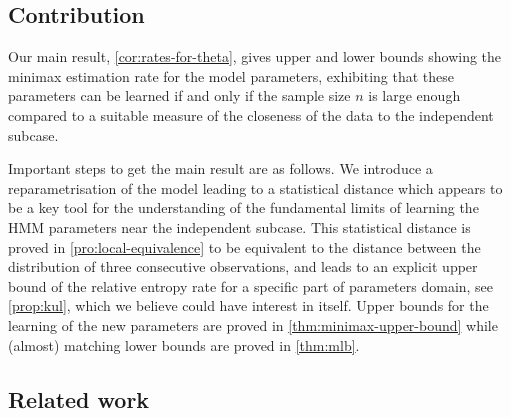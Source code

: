 \documentclass[journal]{IEEEtran}
\newcommand{\1}{\boldsymbol{1}}
\begin{document}



	\subsection{Contribution}

	Our main result, \cref{cor:rates-for-theta}, gives upper and lower bounds showing the minimax estimation rate for the model parameters, exhibiting that these parameters can be learned if and only if the sample size $n$ is large enough compared to a suitable measure of the closeness of the data to the independent subcase.


	Important steps to get the main result are as follows.
We introduce a	reparametrisation of the model leading to a statistical distance which appears to be a key tool for the understanding of the fundamental limits of learning the HMM parameters near the independent subcase. This statistical distance is proved in \cref{pro:local-equivalence}
to be equivalent to the distance between the  distribution of three consecutive observations, and  leads to an explicit upper bound of the relative entropy rate for a specific part of parameters domain, see
	\cref{prop:kul}, which we believe could have interest in itself. Upper bounds for the learning of the new parameters are proved in \cref{thm:minimax-upper-bound} while (almost) matching lower bounds are proved in \cref{thm:mlb}.

	\subsection{Related work}
\end{document}
